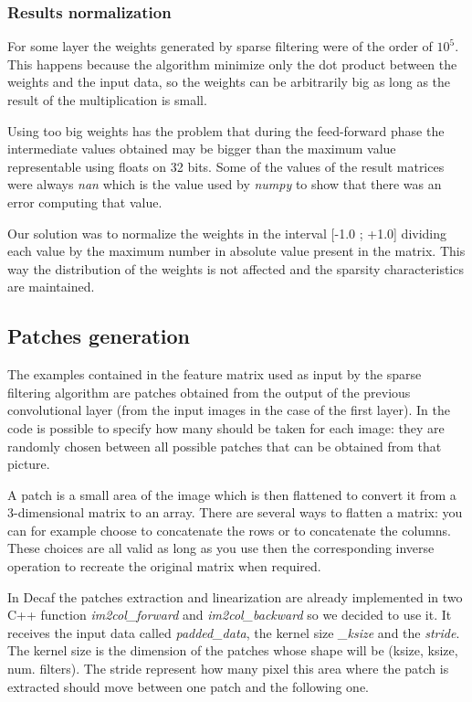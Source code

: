 \subsubsection{Results normalization}

For some layer the weights generated by sparse filtering were of the order of \(10^5\). This happens because the algorithm minimize only the dot product between the weights and the input data, so the weights can be arbitrarily big as long as the result of the multiplication is small.

Using too big weights has the problem that during the feed-forward phase the intermediate values obtained may be bigger than the maximum value representable using floats on 32 bits. Some of the values of the result matrices were always \textit{nan} which is the value used by \textit{numpy} to show that there was an error computing that value.

Our solution was to normalize the weights in the interval [-1.0 ; +1.0] dividing each value by the maximum number in absolute value present in the matrix. This way the distribution of the weights is not affected and the sparsity characteristics are maintained.

\subsection{Patches generation}

The examples contained in the feature matrix used as input by the sparse filtering algorithm are patches obtained from the output of the previous convolutional layer (from the input images in the case of the first layer). In the code is possible to specify how many should be taken for each image: they are randomly chosen between all possible patches that can be obtained from that picture.

A patch is a small area of the image which is then flattened to convert it from a 3-dimensional matrix to an array. There are several ways to flatten a matrix: you can for example choose to concatenate the rows or to concatenate the columns. These choices are all valid as long as you use then the corresponding inverse operation to recreate the original matrix when required.

In Decaf the patches extraction and linearization are already implemented in two C++ function \textit{im2col\_forward} and \textit{im2col\_backward} so we decided to use it. It receives the input data called \textit{padded\_data}, the kernel size \textit{\_ksize} and the \textit{stride}. The kernel size is the dimension of the patches whose shape will be (ksize, ksize, num. filters). The stride represent how many pixel this area where the patch is extracted should move between one patch and the following one.

